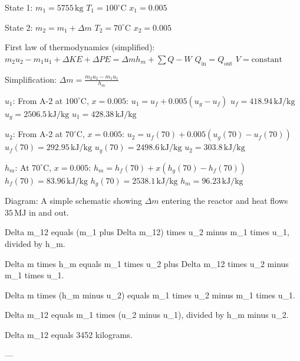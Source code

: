 State 1:  
\( m_1 = 5755 \, \text{kg} \)  
\( T_1 = 100^\circ \text{C} \)  
\( x_1 = 0.005 \)  

State 2:  
\( m_2 = m_1 + \Delta m \)  
\( T_2 = 70^\circ \text{C} \)  
\( x_2 = 0.005 \)  

First law of thermodynamics (simplified):  
\( m_2 u_2 - m_1 u_1 + \Delta KE + \Delta PE = \Delta m h_{m} + \sum Q - W \)  
\( Q_{\text{in}} = Q_{\text{out}} \)  
\( V = \text{constant} \)  

Simplification:  
\( \Delta m = \frac{m_2 u_2 - m_1 u_1}{h_{m}} \)  

\( u_1 \): From A-2 at \( 100^\circ \text{C} \), \( x = 0.005 \):  
\( u_1 = u_f + 0.005 (u_g - u_f) \)  
\( u_f = 418.94 \, \text{kJ/kg} \)  
\( u_g = 2506.5 \, \text{kJ/kg} \)  
\( u_1 = 428.38 \, \text{kJ/kg} \)  

\( u_2 \): From A-2 at \( 70^\circ \text{C} \), \( x = 0.005 \):  
\( u_2 = u_f(70) + 0.005 (u_g(70) - u_f(70)) \)  
\( u_f(70) = 292.95 \, \text{kJ/kg} \)  
\( u_g(70) = 2498.6 \, \text{kJ/kg} \)  
\( u_2 = 303.8 \, \text{kJ/kg} \)  

\( h_{m} \): At \( 70^\circ \text{C} \), \( x = 0.005 \):  
\( h_{m} = h_f(70) + x (h_g(70) - h_f(70)) \)  
\( h_f(70) = 83.96 \, \text{kJ/kg} \)  
\( h_g(70) = 2538.1 \, \text{kJ/kg} \)  
\( h_{m} = 96.23 \, \text{kJ/kg} \)  

Diagram:  
A simple schematic showing \( \Delta m \) entering the reactor and heat flows \( 35 \, \text{MJ} \) in and out.

Delta m_12 equals (m_1 plus Delta m_12) times u_2 minus m_1 times u_1, divided by h_m.  

Delta m times h_m equals m_1 times u_2 plus Delta m_12 times u_2 minus m_1 times u_1.  

Delta m times (h_m minus u_2) equals m_1 times u_2 minus m_1 times u_1.  

Delta m_12 equals m_1 times (u_2 minus u_1), divided by h_m minus u_2.  

Delta m_12 equals 3452 kilograms.  

---